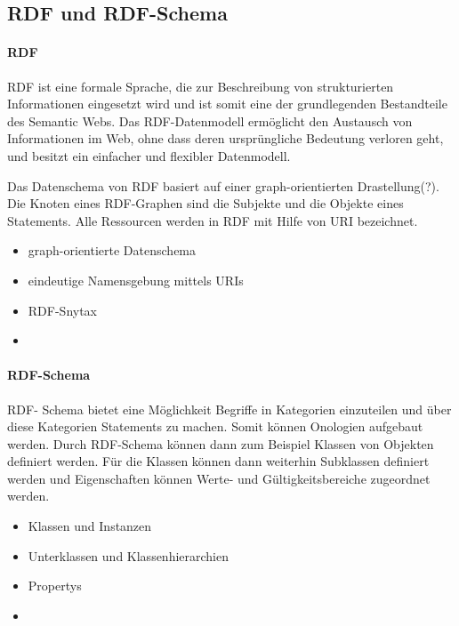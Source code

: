\subsection{RDF und RDF-Schema} 

\paragraph{RDF}

\ac{RDF} ist eine formale Sprache, die zur Beschreibung von strukturierten Informationen eingesetzt wird und ist somit eine der grundlegenden Bestandteile des Semantic Webs.
Das \ac{RDF}-Datenmodell ermöglicht den Austausch von Informationen im Web, ohne dass deren ursprüngliche Bedeutung verloren geht, und besitzt ein einfacher und flexibler Datenmodell. \citep[vgl.]{linkeddatavisualization}

Das Datenschema von \ac{RDF} basiert auf einer graph-orientierten Drastellung(?).
Die Knoten eines RDF-Graphen sind die Subjekte und die Objekte eines Statements.
Alle Ressourcen werden in RDF mit Hilfe von \ac{URI} bezeichnet.

\begin{itemize}
	\item graph-orientierte Datenschema
	\item eindeutige Namensgebung mittels URIs
	\item RDF-Snytax
	\item 
\end{itemize}

\paragraph{RDF-Schema} 

RDF- Schema bietet eine Möglichkeit Begriffe in Kategorien einzuteilen und über diese Kategorien Statements zu machen.
Somit können Onologien aufgebaut werden.
Durch RDF-Schema können dann zum Beispiel Klassen von Objekten definiert werden.
Für die Klassen können dann weiterhin Subklassen definiert werden und Eigenschaften können Werte- und Gültigkeitsbereiche zugeordnet werden. \citep[vgl.]{pellegrinix}

\begin{itemize}
	\item Klassen und Instanzen
	\item Unterklassen und Klassenhierarchien
	\item Propertys
	\item 
\end{itemize}

